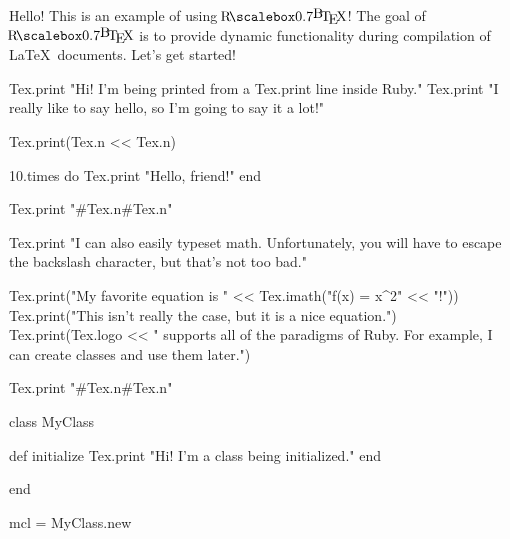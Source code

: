 \documentclass{article}
\begin{document}
Hello! This is an example of using $\RbTeX$! The goal of $\RbTeX$ is to provide dynamic functionality during
compilation of \LaTeX\ documents. Let's get started!\\

\begin{rbtex}
    Tex.print "Hi! I'm being printed from a Tex.print line inside Ruby."
    Tex.print "I really like to say hello, so I'm going to say it a lot!"

    Tex.print(Tex.n << Tex.n)

    10.times do
        Tex.print "Hello, friend!"
    end

    Tex.print "#{Tex.n}#{Tex.n}"

    Tex.print "I can also easily typeset math. Unfortunately, you will have to escape the backslash character, but that's not too bad."

    Tex.print("My favorite equation is " << Tex.imath("f(x) = x^{2}" << "!"))
    Tex.print("This isn't really the case, but it is a nice equation.")
    Tex.print(Tex.logo << " supports all of the paradigms of Ruby. For example, I can create classes and use them later.")

    Tex.print "#{Tex.n}#{Tex.n}"

    class MyClass

        def initialize
            Tex.print "Hi! I'm a class being initialized."
        end

    end

    mcl = MyClass.new
\end{rbtex}
\end{document}
